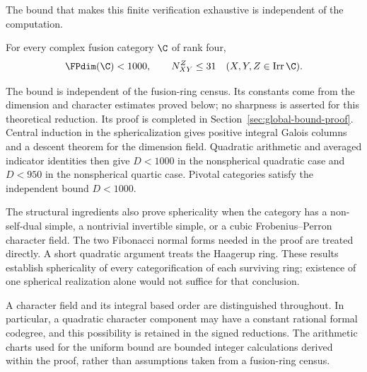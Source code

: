 The bound that makes this finite verification exhaustive is independent
of the computation.
\begin{theorem}\label{thm:uniform-global}
For every complex fusion category $\C$ of rank four,
\[
 \FPdim(\C)<1000,\qquad
 N_{XY}^{Z}\le31
 \quad(X,Y,Z\in\operatorname{Irr}\C).
\]
\end{theorem}

The bound is independent of the fusion-ring census. Its constants come
from the dimension and character estimates proved below; no sharpness
is asserted for this theoretical reduction.
Its proof is completed in Section~\ref{sec:global-bound-proof}.
Central induction in the sphericalization gives positive integral
Galois columns and a descent theorem for the dimension field.
Quadratic arithmetic and averaged indicator identities then give
$D<1000$ in the nonspherical quadratic case and $D<950$ in the
nonspherical quartic case. Pivotal categories satisfy the independent
bound $D<1000$.

The structural ingredients also prove sphericality when the category
has a non-self-dual simple, a nontrivial invertible simple, or a cubic Frobenius--Perron
character field. The two Fibonacci normal forms needed in the proof
are treated directly. A short
quadratic argument treats the Haagerup ring. These results establish
sphericality of every categorification of each surviving ring; existence
of one spherical realization alone would not suffice for that conclusion.

A character field and its integral based order are distinguished
throughout. In particular, a quadratic character component may have a
constant rational formal codegree, and this possibility is retained in
the signed reductions. The arithmetic charts used for the uniform bound
are bounded integer calculations derived within the proof, rather than
assumptions taken from a fusion-ring census.

